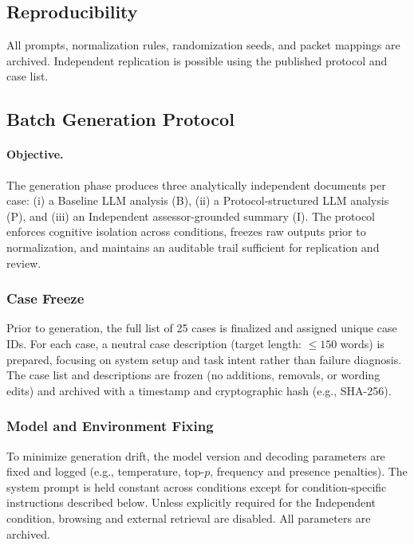 \subsection{Reproducibility}

All prompts, normalization rules, randomization seeds, and packet mappings are archived. Independent replication is possible using the published protocol and case list.

\subsection{Batch Generation Protocol}
\label{sec:batch-generation}

\paragraph{Objective.}
The generation phase produces three analytically independent documents per case: (i) a Baseline LLM analysis (B), (ii) a Protocol-structured LLM analysis (P), and (iii) an Independent assessor-grounded summary (I). The protocol enforces cognitive isolation across conditions, freezes raw outputs prior to normalization, and maintains an auditable trail sufficient for replication and review.

\subsubsection{Case Freeze}

Prior to generation, the full list of 25 cases is finalized and assigned unique case IDs. For each case, a neutral case description (target length: $\leq 150$ words) is prepared, focusing on system setup and task intent rather than failure diagnosis. The case list and descriptions are frozen (no additions, removals, or wording edits) and archived with a timestamp and cryptographic hash (e.g., SHA-256).

\subsubsection{Model and Environment Fixing}

To minimize generation drift, the model version and decoding parameters are fixed and logged (e.g., temperature, top-$p$, frequency and presence penalties). The system prompt is held constant across conditions except for condition-specific instructions described below. Unless explicitly required for the Independent condition, browsing and external retrieval are disabled. All parameters are archived.


